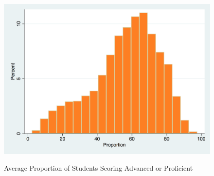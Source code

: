 \documentclass[12pt]{report}
\begin{document}
\begin{figure}[!htb]
    \centering
    \caption{Average Proportion of Students Scoring Advanced or Proficient}
    \includegraphics[frame, scale=0.25]{ag_perform_hist.png}
    \label{fig:my_label}
\end{figure}

\clearpage
\end{document}
